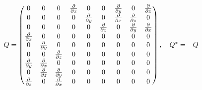 \documentclass[pdftex,a4paper,parskip,listof=totoc,bibliography=totoc,onehalfspacing,12pt]{scrreprt}
\begin{document}
\begin{equation}
Q=
 \begin{pmatrix}
   0          & 0         & 0         & \pdv{}{x} & 0         & 0         & \pdv{}{y} & 0         & \pdv{}{z}\\
   0          & 0         & 0         & 0         & \pdv{}{y} & 0         & \pdv{}{x} & \pdv{}{z} & 0        \\
   0          & 0         & 0         & 0         & 0         & \pdv{}{z} & 0         & \pdv{}{y} & \pdv{}{x}\\
   \pdv{}{x}  & 0         & 0         & 0         & 0         & 0         & 0         & 0         & 0        \\
   0          & \pdv{}{y} & 0         & 0         & 0         & 0         & 0         & 0         & 0        \\
   0          & 0         & \pdv{}{z} & 0         & 0         & 0         & 0         & 0         & 0        \\
   \pdv{}{y}  & \pdv{}{x} &  0        & 0         & 0         & 0         & 0         & 0         & 0        \\
   0          & \pdv{}{z} & \pdv{}{y} & 0         & 0         & 0         & 0         & 0         & 0        \\
   \pdv{}{z}  & 0         & \pdv{}{x} & 0         & 0         & 0         & 0         & 0         & 0        \\
 \end{pmatrix}, \quad Q^{*}=-Q
\end{equation}
\end{document}
